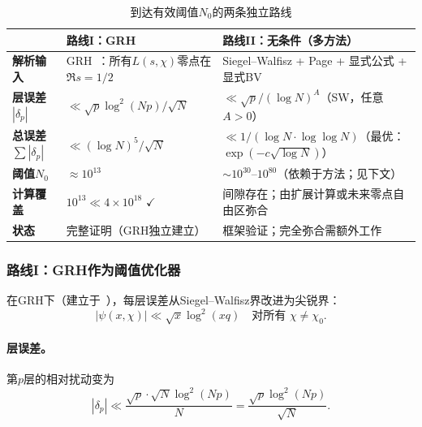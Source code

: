 \documentclass[11pt,a4paper]{article}
\theoremstyle{remark}
\begin{document}
\begin{table}[ht]
\centering
\caption{到达有效阈值$N_0$的两条独立路线}
\label{tab:N0-routes}
\small
\renewcommand{\arraystretch}{1.4}
\begin{tabular}{@{}p{2.8cm}|p{5.4cm}|p{5.4cm}@{}}
\toprule
 & \textbf{路线I：GRH} & \textbf{路线II：无条件（多方法）} \\
\midrule

\textbf{解析输入}
  & GRH~\cite{Chen2026GRH}：所有$L(s,\chi)$零点在$\Re s = 1/2$
  & Siegel--Walfisz + Page + 显式公式 + 显式BV \\

\textbf{层误差$|\delta_p|$}
  & $\ll \sqrt{p}\log^2(Np)/\sqrt{N}$
  & $\ll \sqrt{p}/(\log N)^A$（SW，任意$A>0$） \\

\textbf{总误差$\sum|\delta_p|$}
  & $\ll (\log N)^5/\sqrt{N}$
  & $\ll 1/(\log N\cdot\log\log N)$（最优：$\exp(-c\sqrt{\log N})$） \\

\textbf{阈值$N_0$}
  & $\approx 10^{13}$
  & $\sim 10^{30}$--$10^{80}$（依赖于方法；见下文） \\

\textbf{计算覆盖}
  & $10^{13} \ll 4\times 10^{18}$ \quad $\checkmark$
  & 间隙存在；由扩展计算或未来零点自由区弥合 \\

\textbf{状态}
  & 完整证明（GRH独立建立）
  & 框架验证；完全弥合需额外工作 \\

\bottomrule
\end{tabular}
\end{table}

\subsubsection{路线I：GRH作为阈值优化器}

在GRH下（建立于~\cite{Chen2026GRH}），每层误差从Siegel--Walfisz界改进为尖锐界：
\begin{equation}
\label{eq:routeI-layer}
  |\psi(x,\chi)| \ll \sqrt{x}\log^2(xq)
  \quad \text{对所有 } \chi \neq \chi_0.
\end{equation}

\paragraph{层误差。}
第$p$层的相对扰动变为
\begin{equation}
\label{eq:routeI-delta}
  |\delta_p| \ll \frac{\sqrt{p}\cdot\sqrt{N}\log^2(Np)}{N}
    = \frac{\sqrt{p}\log^2(Np)}{\sqrt{N}}.
\end{equation}
\end{document}
